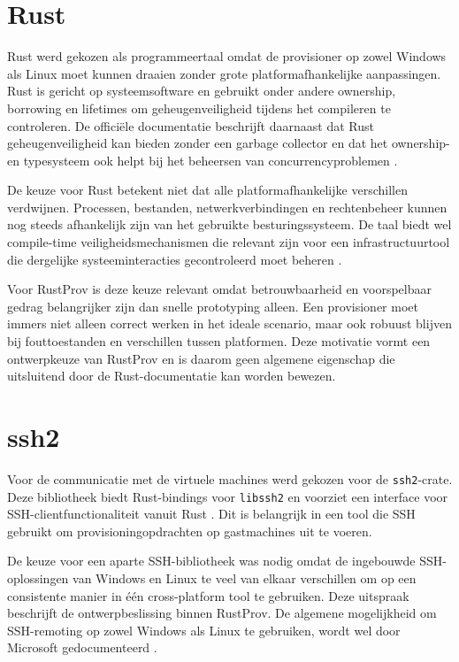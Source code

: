 \section{Rust}

Rust werd gekozen als programmeertaal omdat de provisioner op zowel Windows als Linux moet kunnen draaien zonder grote platformafhankelijke aanpassingen. Rust is gericht op systeemsoftware en gebruikt onder andere ownership, borrowing en lifetimes om geheugenveiligheid tijdens het compileren te controleren. De officiële documentatie beschrijft daarnaast dat Rust geheugenveiligheid kan bieden zonder een garbage collector en dat het ownership- en typesysteem ook helpt bij het beheersen van concurrencyproblemen \autocite{Klabnik2018}.

De keuze voor Rust betekent niet dat alle platformafhankelijke verschillen verdwijnen. Processen, bestanden, netwerkverbindingen en rechtenbeheer kunnen nog steeds afhankelijk zijn van het gebruikte besturingssysteem. De taal biedt wel compile-time veiligheidsmechanismen die relevant zijn voor een infrastructuurtool die dergelijke systeeminteracties gecontroleerd moet beheren \autocite{Klabnik2018}.

Voor RustProv is deze keuze relevant omdat betrouwbaarheid en voorspelbaar gedrag belangrijker zijn dan snelle prototyping alleen. Een provisioner moet immers niet alleen correct werken in het ideale scenario, maar ook robuust blijven bij fouttoestanden en verschillen tussen platformen. Deze motivatie vormt een ontwerpkeuze van RustProv en is daarom geen algemene eigenschap die uitsluitend door de Rust-documentatie kan worden bewezen.

\section{ssh2}

Voor de communicatie met de virtuele machines werd gekozen voor de \texttt{ssh2}-crate. Deze bibliotheek biedt Rust-bindings voor \texttt{libssh2} en voorziet een interface voor SSH-clientfunctionaliteit vanuit Rust \autocite{Ssh2Docs2026}. Dit is belangrijk in een tool die SSH gebruikt om provisioningopdrachten op gastmachines uit te voeren.

De keuze voor een aparte SSH-bibliotheek was nodig omdat de ingebouwde SSH-oplossingen van Windows en Linux te veel van elkaar verschillen om op een consistente manier in één cross-platform tool te gebruiken. Deze uitspraak beschrijft de ontwerpbeslissing binnen RustProv. De algemene mogelijkheid om SSH-remoting op zowel Windows als Linux te gebruiken, wordt wel door Microsoft gedocumenteerd \autocite{MicrosoftPS2025}.

